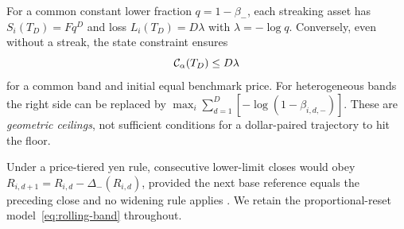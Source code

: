 \documentclass[review,hidelinks,onefignum,onetabnum]{siamonline250211}
\begin{document}
For a common constant lower fraction $q=1-\beta_-$, each streaking asset has
$S_i(T_D)=Fq^D$ and loss $L_i(T_D)=D\lambda$ with $\lambda=-\log q$. Conversely, even without a streak, the state constraint ensures
\begin{equation}\label{eq:rolling-cumulative-upper}
  \mathcal{C}_\alpha(T_D)\le D\lambda
\end{equation}
for a common band and initial equal benchmark price. For heterogeneous bands the right side can be replaced by
$\max_i\sum_{d=1}^D[-\log(1-\beta_{i,d,-})]$. These are \emph{geometric ceilings}, not sufficient conditions for a dollar-paired trajectory to hit the floor.

Under a price-tiered yen rule, consecutive lower-limit closes would obey $R_{i,d+1}=R_{i,d}-\Delta_-(R_{i,d})$, provided the next base reference equals the preceding close and no widening rule applies \citep{JPX2026}. We retain the proportional-reset model~\eqref{eq:rolling-band} throughout.
\end{document}
